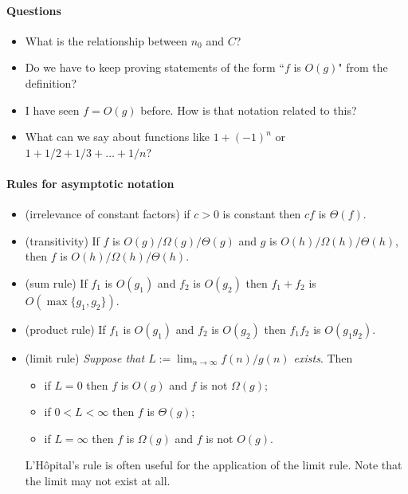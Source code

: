 \paragraph{Questions}
\begin{itemize}
\item What is the relationship between $n_0$ and $C$?
\item Do we have to keep proving statements of the form ``$f$ is $O(g)$" from the definition?
\item I have seen $f = O(g)$ before. How is that notation related to this?
\item What can we say about functions like $1+(-1)^n$ or $1+1/2+1/3+\dots + 1/n$?
\end{itemize}


\paragraph{Rules for asymptotic notation}
\begin{itemize}
\item (irrelevance of constant factors) if $c > 0$ is constant then $cf$ is $\Theta(f)$.
\item (transitivity) If $f$ is $O(g)/\Omega(g)/\Theta(g)$ and $g$ is 
$O(h)/\Omega(h)/\Theta(h)$, then $f$ is $O(h)/\Omega(h)/\Theta(h)$.
\item (sum rule) If $f_1$ is $O(g_1)$ and $f_2$ is $O(g_2)$ then $f_1 + f_2$ is 
$O(\max\{g_1, g_2\})$.
\item (product rule) If $f_1$ is $O(g_1)$ and $f_2$ is $O(g_2)$ then $f_1 f_2$ 
is $O(g_1 g_2)$.
\item (limit rule) \emph{Suppose that $L:=\lim_{n\to\infty} f(n)/g(n)$ exists}. 
Then
\begin{itemize}
\item if $L = 0$ then $f$ is $O(g)$ and $f$ is not $\Omega(g)$;
\item if $0 < L < \infty$ then $f$ is $\Theta(g)$;
\item if $L = \infty$ then $f$ is $\Omega(g)$ and $f$ is not $O(g)$.
\end{itemize}


L'H\^{o}pital's rule is often useful for the application of the limit rule. Note that the 
limit may not exist at all.
\end{itemize}


